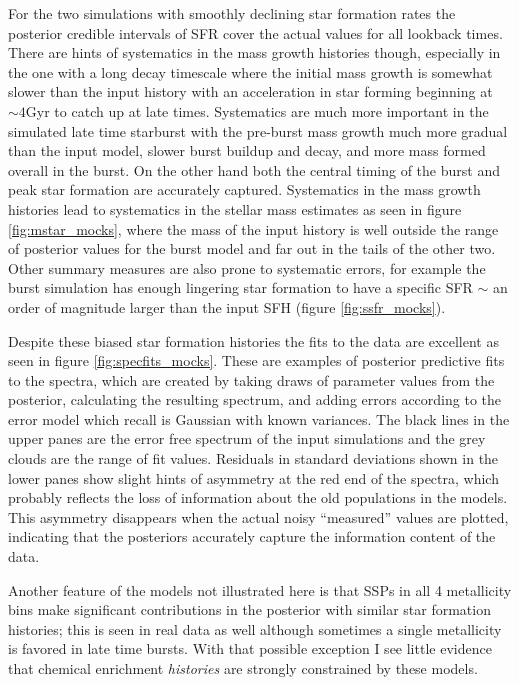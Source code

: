 \documentclass[modern]{aastex62}
\begin{document}
For the two simulations with smoothly declining star formation rates the posterior credible intervals of SFR cover the actual values for all lookback times. There are hints of systematics in the mass growth histories though, especially in the one with a long decay timescale where the initial mass growth is somewhat slower than the input history with an acceleration in star forming beginning at $\sim 4$Gyr to catch up at late times. Systematics are much more important in the simulated late time starburst with the pre-burst mass growth much more gradual than the input model, slower burst buildup and decay, and more mass formed overall in the burst. On the other hand both the central timing of the burst and peak star formation are accurately captured. Systematics in the mass growth histories lead to systematics in the stellar mass estimates as seen in figure \ref{fig:mstar_mocks}, where the mass of the input history is well outside the range of posterior values for the burst model and far out in the tails of the other two. Other summary measures are also prone to systematic errors, for example the burst simulation has enough lingering star formation to have a specific SFR $\sim$ an order of magnitude larger than the input SFH (figure \ref{fig:ssfr_mocks}).

Despite these biased star formation histories the fits to the data are excellent as seen in figure \ref{fig:specfits_mocks}. These are examples of posterior predictive fits to the spectra, which are created by taking draws of parameter values from the posterior, calculating the resulting spectrum, and adding errors according to the error model which recall is Gaussian with known variances. The black lines in the upper panes are the error free spectrum of the input simulations and the grey clouds are the range of fit values. Residuals in standard deviations shown in the lower panes show slight hints of asymmetry at the red end of the spectra, which probably reflects the loss of information about the old populations in the models. This asymmetry disappears when the actual noisy ``measured'' values are plotted, indicating that the posteriors accurately capture the information content of the data.

Another feature of the models not illustrated here is that SSPs in all 4 metallicity bins make significant contributions in the posterior with similar star formation histories; this is seen in real data as well although sometimes a single metallicity is favored in late time bursts. With that possible exception I see little evidence that chemical enrichment \emph{histories} are strongly constrained by these models.
\end{document}
